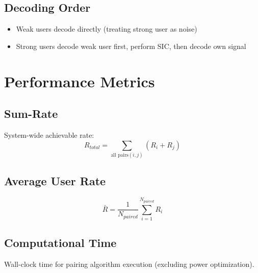 \subsection{Decoding Order}
\begin{itemize}
    \item Weak users decode directly (treating strong user as noise)
    \item Strong users decode weak user first, perform SIC, then decode own signal
\end{itemize}

\section{Performance Metrics}

\subsection{Sum-Rate}
System-wide achievable rate:
\begin{equation}
R_{total} = \sum_{\text{all pairs} (i,j)} (R_i + R_j)
\end{equation}

\subsection{Average User Rate}
\begin{equation}
\bar{R} = \frac{1}{N_{paired}} \sum_{i=1}^{N_{paired}} R_i
\end{equation}

\subsection{Computational Time}
Wall-clock time for pairing algorithm execution (excluding power optimization).
